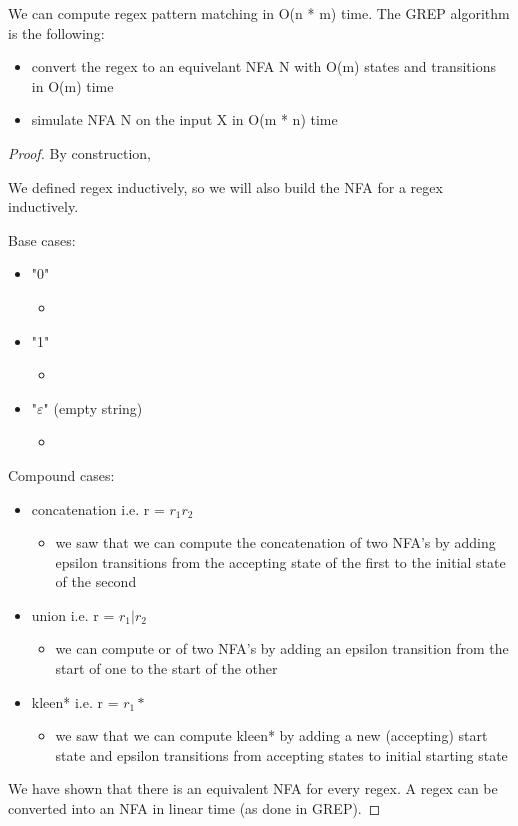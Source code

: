 We can compute regex pattern matching in O(n * m) time. The GREP algorithm is the following:
\begin{itemize}
    \item convert the regex to an equivelant NFA N with O(m) states and transitions in O(m) time
    \item simulate NFA N on the input X in O(m * n) time
\end{itemize}

\begin{proof}
    By construction,

    We defined regex inductively, so we will also build the NFA for a regex inductively.

    Base cases:
    \begin{itemize}
        \item "0" 
        \begin{itemize}
            \item {}
        \end{itemize}
        \item "1"
        \begin{itemize}
            \item {}
        \end{itemize}
        \item "$\varepsilon$" (empty string)
        \begin{itemize}
            \item {}
        \end{itemize}
    \end{itemize}

    Compound cases:
    \begin{itemize}
        \item concatenation i.e. r = $r_1r_2$
        \begin{itemize}
            \item we saw that we can compute the concatenation of two NFA's by adding epsilon transitions from the accepting state of the first to the initial state of the second
        \end{itemize}
        \item union i.e. r = $r_1 | r_2$
        \begin{itemize}
            \item we can compute or of two NFA's by adding an epsilon transition from the start of one to the start of the other
        \end{itemize}
        \item kleen* i.e. r = $r_1*$
        \begin{itemize}
            \item we saw that we can compute kleen* by adding a new (accepting) start state and epsilon transitions from accepting states to initial starting state
        \end{itemize}
    \end{itemize}

    We have shown that there is an equivalent NFA for every regex. A regex can be converted into an NFA in linear time (as done in GREP).
\end{proof}


